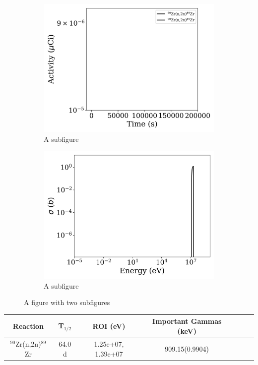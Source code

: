 \begin{figure}[h]
\centering
\begin{subfigure}{.5\textwidth}
  \centering
     \includegraphics[width=.8\textwidth]{plot/Zr-90(n,2n)Zr-89_library1} 

  \caption{A subfigure}
  \label{fig:sub1}
\end{subfigure}%
\begin{subfigure}{.5\textwidth}
  \centering
     \includegraphics[width=.8\textwidth]{plot/Zr-90(n,2n)Zr-89} 

  \caption{A subfigure}
  \label{fig:sub2}
\end{subfigure}
\caption{A figure with two subfigures}
\label{fig:test}
\end{figure}

\begin{table}[h]
\centering
\begin{tabular}{ |c|c|c|c|c|c|c| }
 \hline
 Reaction & T$_{1/2}$ & ROI (eV) & Important Gammas (keV) \\
 \hline 
 $^{90}$Zr(n,2n)$^{89}$Zr & 64.0 d & 1.25e+07, 1.39e+07 & 909.15(0.9904) \\ 
\hline
\end{tabular}
\end{table}
